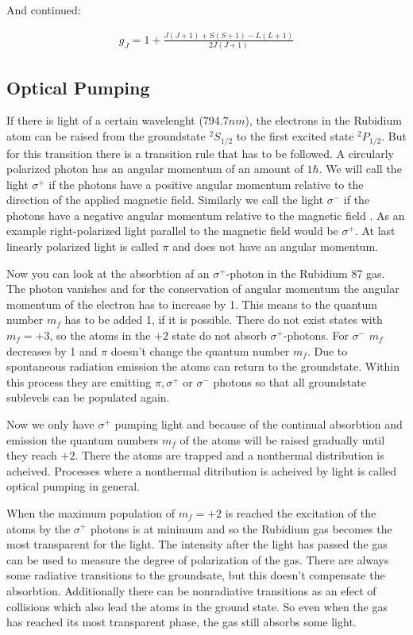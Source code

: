 And continued:

\begin{align}
g_J=1 + \frac{J\left(J+1\right)+S\left(S+1\right)-L\left(L+1\right)}{2J\left(J+1\right)}
\end{align}

\subsection{Optical Pumping}
If there is light of a certain wavelenght ($794.7nm$), the electrons in the Rubidium atom can be raised from the groundstate $^2S_{1/2}$ to the first excited state $^2P_{1/2}$. But for this transition there is a transition rule that has to be followed. A circularly polarized photon has an angular momentum of an amount of $1\hbar$. We will call the light $\sigma^+$ if the photons have a positive angular momentum relative to the direction of the applied magnetic field. Similarly we call the light $\sigma^-$ if the photons have a negative angular momentum relative to the magnetic field \cite{manual2}. As an example right-polarized light parallel to the magnetic field would be $\sigma^+$. At last linearly polarized light is called $\pi$ and does not have an angular momentum.

Now you can look at the absorbtion af an $\sigma^+$-photon in the Rubidium 87 gas. The photon vanishes and for the conservation of angular momentum the angular momentum of the electron has to increase by 1. This means to the quantum number $m_f$ has to be added 1, if it is possible. There do not exist states with $m_f=+3$, so the atoms in the $+2$ state do not absorb $\sigma^+$-photons. For $\sigma^-$ $m_f$ decreases by 1 and $\pi$ doesn't change the quantum number $m_f$. Due to spontaneous radiation emission the atoms can return to the groundstate. Within this process they are emitting $\pi, \sigma^+$ or $\sigma^-$ photons so that all groundstate sublevels can be populated again.

Now we only have $\sigma^+$ pumping light and because of the continual absorbtion and emission the quantum numbers $m_f$ of the atoms will be raised gradually until they reach $+2$. There the atoms are trapped and a nonthermal distribution is acheived. Processes where a nonthermal ditribution is acheived by light is called optical pumping in general.

When the maximum population of $m_f=+2$ is reached the excitation of the atoms by the $\sigma^+$ photons is at minimum and so the Rubidium gas becomes the most transparent for the light. The intensity after the light has passed the gas can be used to measure the degree of polarization of the gas. There are always some radiative transitions to the groundsate, but this doesn't compensate the absorbtion. Additionally there can be nonradiative transitions as an efect of collisions which also lead the atoms in the ground state. So even  when the gas has reached its most transparent phase, the gas still absorbs some light.

